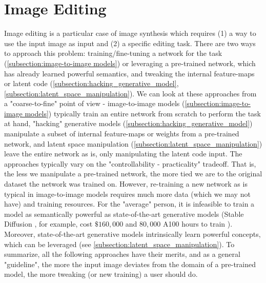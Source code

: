 \section{Image Editing}\label{section:image_editing}

Image editing is a particular case of image synthesis which requires (1) a way to use the 
input image as input and (2) a specific editing task. There are two ways to approach this 
problem: training/fine-tuning a network for the task (\ref{subsection:image-to-image models}) or 
leveraging a pre-trained network, which has already learned powerful semantics, and tweaking the 
internal feature-maps or latent code (\ref{subsection:hacking_generative_model}, \ref{subsection:latent_space_manipulation}).
We can look at these approaches from a "coarse-to-fine" point of view - image-to-image models (\ref{subsection:image-to-image models})
typically train an entire network from scratch to perform the task at hand, "hacking" generative models (\ref{subsection:hacking_generative_model})
manipulate a subset of internal feature-maps or weights from a pre-trained network, and latent space manipulation (\ref{subsection:latent_space_manipulation})
leave the entire network as is, only manipulating the latent code input. The approaches typically 
vary on the "controllability - practicality" tradeoff. That is, the less we manipulate a pre-trained 
network, the more tied we are to the original dataset the network was trained on. However, re-training 
a new network as is typical in image-to-image models requires much more data (which we may not have)
and training resources. For the "average" person, it is infeasible to train a model as semantically powerful as 
state-of-the-art generative models (Stable Diffusion \citep{rombach2022high}, for example, cost $\$160,000$ and 
$80,000$ A100 \citep{gpua100} hours to train \citep{MosaicML}). Moreover, state-of-the-art generative models 
intrinsically learn powerful concepts, which can be leveraged (see \ref{subsection:latent_space_manipulation}). 
To summarize, all the following approaches have their merits, and as a general "guideline", the more the 
input image deviates from the domain of a pre-trained model, the more tweaking (or new training) a user 
should do.

